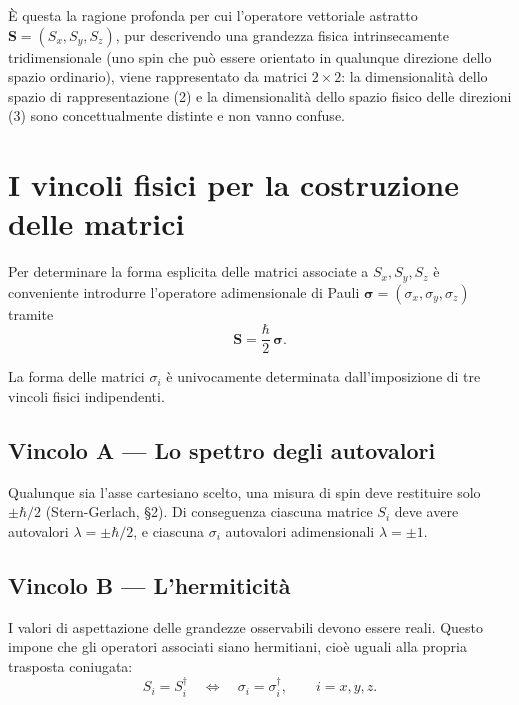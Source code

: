 \documentclass[11pt,a4paper]{article}
\begin{document}
È questa la ragione profonda per cui l'operatore vettoriale astratto $\mathbf{S}=(S_x,S_y,S_z)$, pur descrivendo una grandezza fisica intrinsecamente tridimensionale (uno spin che può essere orientato in qualunque direzione dello spazio ordinario), viene rappresentato da matrici $2\times2$: la dimensionalità dello spazio di rappresentazione (2) e la dimensionalità dello spazio fisico delle direzioni (3) sono concettualmente distinte e non vanno confuse.

\section{I vincoli fisici per la costruzione delle matrici}

Per determinare la forma esplicita delle matrici associate a $S_x, S_y, S_z$ è conveniente introdurre l'operatore adimensionale di Pauli $\boldsymbol{\sigma}=(\sigma_x,\sigma_y,\sigma_z)$ tramite
\begin{equation}
\mathbf{S} = \frac{\hbar}{2}\,\boldsymbol{\sigma}.
\label{eq:S-sigma}
\end{equation}

La forma delle matrici $\sigma_i$ è univocamente determinata dall'imposizione di tre vincoli fisici indipendenti.

\subsection*{Vincolo A --- Lo spettro degli autovalori}

Qualunque sia l'asse cartesiano scelto, una misura di spin deve restituire solo $\pm\hbar/2$ (Stern-Gerlach, \S 2). Di conseguenza ciascuna matrice $S_i$ deve avere autovalori $\lambda=\pm\hbar/2$, e ciascuna $\sigma_i$ autovalori adimensionali $\lambda=\pm 1$.

\subsection*{Vincolo B --- L'hermiticità}

I valori di aspettazione delle grandezze osservabili devono essere reali. Questo impone che gli operatori associati siano hermitiani, cioè uguali alla propria trasposta coniugata:
\begin{equation}
S_i = S_i^\dagger \quad\Longleftrightarrow\quad \sigma_i=\sigma_i^\dagger, \qquad i=x,y,z.
\label{eq:hermiticita}
\end{equation}
\end{document}
